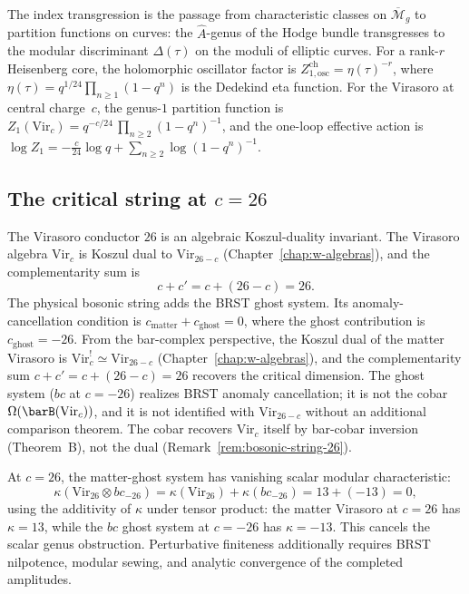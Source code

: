 The index transgression is the passage from characteristic classes on
$\overline{\mathcal{M}}_g$ to partition functions on curves: the
$\hat{A}$-genus of the Hodge bundle transgresses to the modular
discriminant $\Delta(\tau)$ on the moduli of elliptic curves. For a
rank-$r$ Heisenberg core, the holomorphic oscillator factor is
$Z^{\mathrm{ch}}_{1,\mathrm{osc}} = \eta(\tau)^{-r}$, where
$\eta(\tau) = q^{1/24}
\prod_{n \ge 1}(1 - q^n)$ is the Dedekind eta function.
For the Virasoro at central charge~$c$, the genus-$1$ partition
function is $Z_1(\mathrm{Vir}_c) = q^{-c/24}\,\prod_{n \ge 2}
(1-q^n)^{-1}$, and the one-loop effective action is
$\log Z_1 = -\frac{c}{24}\log q + \sum_{n \ge 2} \log(1-q^n)^{-1}$.

\subsection{The critical string at $c = 26$}
\label{subsec:thqg-intro-critical-string}

The Virasoro conductor $26$ is an algebraic Koszul-duality invariant.
The Virasoro algebra $\mathrm{Vir}_c$ is Koszul dual to
$\mathrm{Vir}_{26-c}$
(Chapter~\ref{chap:w-algebras}), and the
complementarity sum is
\[
c + c' = c + (26 - c) = 26.
\]
The physical bosonic string adds the BRST ghost system. Its
anomaly-cancellation condition is
$c_{\mathrm{matter}} + c_{\mathrm{ghost}} = 0$, where the ghost
contribution is $c_{\mathrm{ghost}} = -26$. From the bar-complex
perspective, the Koszul dual of the matter Virasoro is
$\mathrm{Vir}_c^! \simeq \mathrm{Vir}_{26-c}$
(Chapter~\ref{chap:w-algebras}), and the complementarity sum
$c + c' = c + (26 - c) = 26$ recovers the critical dimension.
The ghost system ($bc$ at $c = -26$) realizes BRST anomaly
cancellation; it is not the cobar
$\Omega(\barB(\mathrm{Vir}_c))$, and it is not identified with
$\mathrm{Vir}_{26-c}$ without an additional comparison theorem. The
cobar recovers $\mathrm{Vir}_c$ itself by bar-cobar inversion
(Theorem~B), not the dual (Remark~\ref{rem:bosonic-string-26}).

At $c = 26$, the matter-ghost system has vanishing scalar modular
characteristic:
\[
\kappa(\mathrm{Vir}_{26} \otimes bc_{-26})
= \kappa(\mathrm{Vir}_{26}) + \kappa(bc_{-26})
= 13 + (-13) = 0,
\]
using the additivity of $\kappa$ under tensor product: the matter
Virasoro at $c = 26$ has $\kappa = 13$, while the $bc$ ghost system
at $c = -26$ has $\kappa = -13$. This cancels the scalar genus
obstruction. Perturbative finiteness additionally requires BRST
nilpotence, modular sewing, and analytic convergence of the completed
amplitudes.

